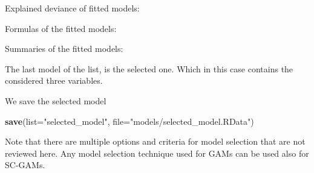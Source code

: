 \documentclass[
]{book}
\newenvironment{Shaded}{\begin{snugshade}}{\end{snugshade}}
\newcommand{\AttributeTok}[1]{\textcolor[rgb]{0.13,0.29,0.53}{#1}}
\newcommand{\ControlFlowTok}[1]{\textcolor[rgb]{0.13,0.29,0.53}{\textbf{#1}}}
\newcommand{\FunctionTok}[1]{\textcolor[rgb]{0.13,0.29,0.53}{\textbf{#1}}}
\newcommand{\NormalTok}[1]{#1}
\newcommand{\OtherTok}[1]{\textcolor[rgb]{0.56,0.35,0.01}{#1}}
\newcommand{\SpecialCharTok}[1]{\textcolor[rgb]{0.81,0.36,0.00}{\textbf{#1}}}
\newcommand{\StringTok}[1]{\textcolor[rgb]{0.31,0.60,0.02}{#1}}
\begin{document}
Explained deviance of fitted models:

\begin{Shaded}
\end{Shaded}

Formulas of the fitted models:

\begin{Shaded}
\end{Shaded}

Summaries of the fitted models:

\begin{Shaded}
\end{Shaded}

The last model of the list, is the selected one. Which in this case contains the considered three variables.

\begin{Shaded}
\end{Shaded}

We save the selected model

\begin{Shaded}
\begin{Highlighting}[]
\FunctionTok{save}\NormalTok{(}\AttributeTok{list=}\StringTok{"selected\_model"}\NormalTok{, }\AttributeTok{file=}\StringTok{"models/selected\_model.RData"}\NormalTok{)}
\end{Highlighting}
\end{Shaded}

Note that there are multiple options and criteria for model selection that are not reviewed here. Any model selection technique used for GAMs can be used also for SC-GAMs.
\end{document}

